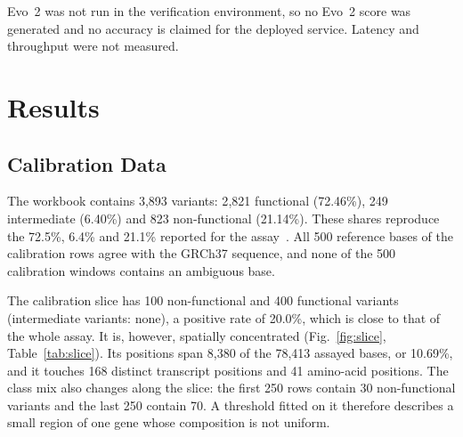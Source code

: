 \documentclass[10pt,journal,a4paper]{IEEEtran}
\begin{document}
Evo~2 was not run in the verification environment, so no Evo~2 score was generated and no accuracy is claimed for the deployed service. Latency and throughput were not measured.

\section{Results}
\label{sec:results}

\subsection{Calibration Data}
\label{sec:res-data}
The workbook contains 3{,}893 variants: 2{,}821 functional (72.46\%), 249 intermediate (6.40\%) and 823 non-functional (21.14\%). These shares reproduce the 72.5\%, 6.4\% and 21.1\% reported for the assay~\cite{findlay2018brca1}. All 500 reference bases of the calibration rows agree with the GRCh37 sequence, and none of the 500 calibration windows contains an ambiguous base.

The calibration slice has 100 non-functional and 400 functional variants (intermediate variants: none), a positive rate of 20.0\%, which is close to that of the whole assay. It is, however, spatially concentrated (Fig.~\ref{fig:slice}, Table~\ref{tab:slice}). Its positions span 8{,}380 of the 78{,}413 assayed bases, or 10.69\%, and it touches 168 distinct transcript positions and 41 amino-acid positions. The class mix also changes along the slice: the first 250 rows contain 30 non-functional variants and the last 250 contain 70. A threshold fitted on it therefore describes a small region of one gene whose composition is not uniform.
\end{document}
